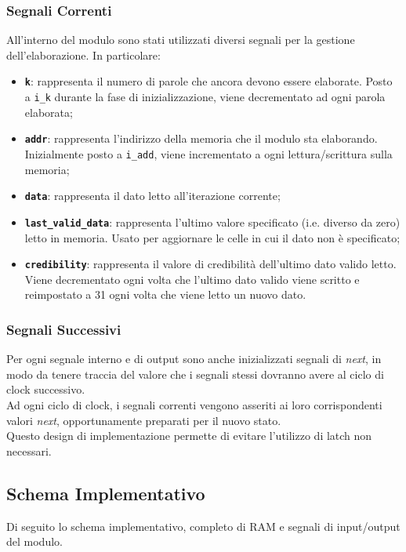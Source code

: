 \documentclass{article}
\begin{document}
\subsubsection{Segnali Correnti}
All'interno del modulo sono stati utilizzati diversi segnali per la gestione dell'elaborazione.
In particolare:
\begin{itemize}[label=\raisebox{0.25ex}{\tiny$\bullet$}]
    \item \texttt{\textbf{k}}: rappresenta il numero di parole che ancora devono essere elaborate. Posto a \texttt{i\_k} durante la fase di inizializzazione, viene decrementato ad ogni parola elaborata;
    \item \texttt{\textbf{addr}}: rappresenta l'indirizzo della memoria che il modulo sta elaborando. Inizialmente posto a \texttt{i\_add}, viene incrementato a ogni lettura/scrittura sulla memoria;
    \item \texttt{\textbf{data}}: rappresenta il dato letto all'iterazione corrente;
    \item \texttt{\textbf{last\_valid\_data}}: rappresenta l'ultimo valore specificato (i.e. diverso da zero) letto in memoria. Usato per aggiornare le celle in cui il dato non è specificato;
    \item \texttt{\textbf{credibility}}: rappresenta il valore di credibilità dell'ultimo dato valido letto. Viene decrementato ogni volta che l'ultimo dato valido viene scritto e reimpostato a 31 ogni volta che viene letto un nuovo dato.
\end{itemize}
\subsubsection{Segnali Successivi}
Per ogni segnale interno e di output sono anche inizializzati segnali di \textit{next}, in modo da tenere traccia del valore che i segnali stessi dovranno avere al ciclo di clock successivo.
\medskip \\
Ad ogni ciclo di clock, i segnali correnti vengono asseriti ai loro corrispondenti valori \textit{next}, opportunamente preparati per il nuovo stato.
\medskip \\
Questo design di implementazione permette di evitare l'utilizzo di latch non necessari.

\vspace{1.5cm}
\subsection{Schema Implementativo}
Di seguito lo schema implementativo, completo di RAM e segnali di input/output del modulo.
\end{document}
